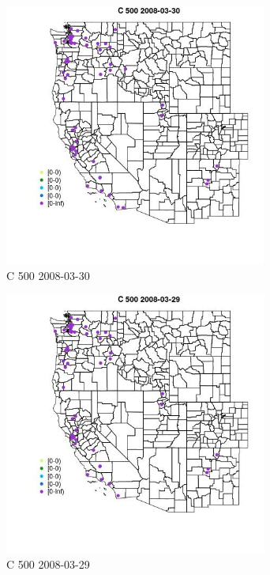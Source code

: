\begin{figure} 
\centering  
\includegraphics[width=0.77\textwidth]{Code_Outputs/Report_ML_input_PM25_Step4_part_e_de_duplicated_aves_MapObsC_5002008-03-30.jpg} 
\caption{\label{fig:Report_ML_input_PM25_Step4_part_e_de_duplicated_avesMapObsC_5002008-03-30}C 500 2008-03-30} 
\end{figure} 
 

\begin{figure} 
\centering  
\includegraphics[width=0.77\textwidth]{Code_Outputs/Report_ML_input_PM25_Step4_part_e_de_duplicated_aves_MapObsC_5002008-03-29.jpg} 
\caption{\label{fig:Report_ML_input_PM25_Step4_part_e_de_duplicated_avesMapObsC_5002008-03-29}C 500 2008-03-29} 
\end{figure} 
 

